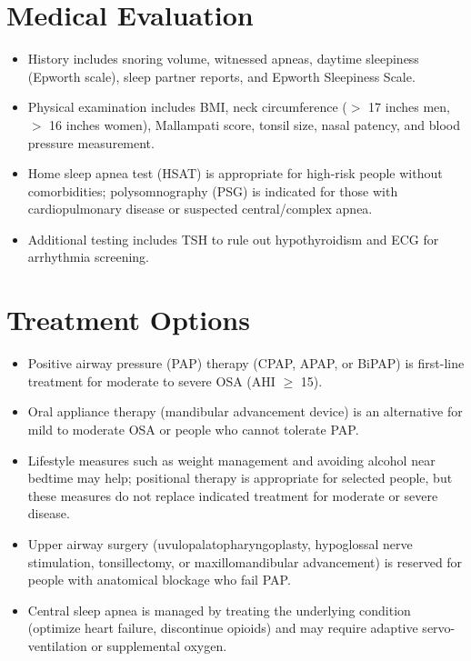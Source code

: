 \section*{Medical Evaluation}
\begin{itemize}
  \item History includes snoring volume, witnessed apneas, daytime sleepiness (Epworth scale), sleep partner reports, and Epworth Sleepiness Scale.
  \item Physical examination includes BMI, neck circumference ($>$ 17 inches men, $>$ 16 inches women), Mallampati score, tonsil size, nasal patency, and blood pressure measurement.
  \item Home sleep apnea test (HSAT) is appropriate for high-risk people without comorbidities; polysomnography (PSG) is indicated for those with cardiopulmonary disease or suspected central/complex apnea.
  \item Additional testing includes TSH to rule out hypothyroidism and ECG for arrhythmia screening.
\end{itemize}

\section*{Treatment Options}
\begin{itemize}
  \item Positive airway pressure (PAP) therapy (CPAP, APAP, or BiPAP) is first-line treatment for moderate to severe OSA (AHI $\ge$ 15).
  \item Oral appliance therapy (mandibular advancement device) is an alternative for mild to moderate OSA or people who cannot tolerate PAP.
  \item Lifestyle measures such as weight management and avoiding alcohol near bedtime may help; positional therapy is appropriate for selected people, but these measures do not replace indicated treatment for moderate or severe disease.
  \item Upper airway surgery (uvulopalatopharyngoplasty, hypoglossal nerve stimulation, tonsillectomy, or maxillomandibular advancement) is reserved for people with anatomical blockage who fail PAP.
  \item Central sleep apnea is managed by treating the underlying condition (optimize heart failure, discontinue opioids) and may require adaptive servo-ventilation or supplemental oxygen.
\end{itemize}

